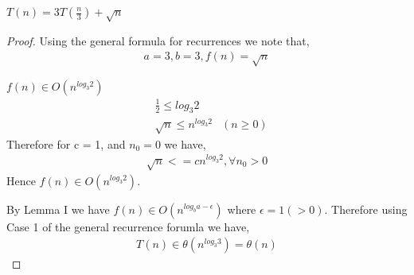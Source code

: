 \documentclass[12pt]{article}
\newenvironment{lemma}[2][Lemma]{\begin{trivlist}
\item[\hskip \labelsep {\bfseries #1}\hskip \labelsep {\bfseries #2.}]}{\end{trivlist}}
\newenvironment{question}[2][Question]{\begin{trivlist}
\item[\hskip \labelsep {\bfseries #1}\hskip \labelsep {\bfseries #2.}]}{\end{trivlist}}
\begin{document}
\begin{question}{5 (b)} $T(n) = 3T(\frac{n}{3}) + \sqrt{n}$
  \leavevmode \\
  \begin{proof}
    Using the general formula for recurrences we note that,
    \begin{align*}
      a = 3, b = 3, f(n) = \sqrt{n}
    \end{align*}

    \begin{lemma}{1} $f(n) \in O(n^{log_{3}2})$
      \begin{align*}
        &\frac{1}{2} \leq log_{3}2  &\\
        &\sqrt{n} \leq n^{log_{3}2} & (n \geq 0)
      \end{align*}
      Therefore for c = 1, and $n_{0} = 0$ we have,
      \begin{align*}
        \sqrt{n} <= cn^{log_{3}2}, \forall n_{0} > 0
      \end{align*}
      Hence $f(n) \in O(n^{log_{3}2})$.
    \end{lemma}

    By Lemma I we have $f(n) \in O(n^{log_{b}a - \epsilon})$ where $\epsilon = 1 (>0)$.
    Therefore using Case 1 of the general recurrence forumla we have,
    \begin{align*}
      T(n) \in \theta(n^{log_{3}3}) = \theta(n)
    \end{align*}
  \end{proof}
\end{question}
\end{document}
